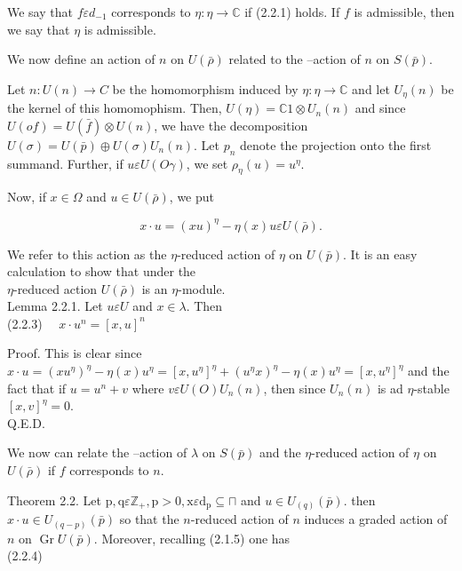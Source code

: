 \documentclass[10pt]{article}
\begin{document}
We say that $f \varepsilon d_{-1}$ corresponds to $\eta: \eta \rightarrow \mathbb{C}$ if (2.2.1) holds. If $f$ is admissible, then we say that $\eta$ is admissible.

We now define an action of $n$ on $U(\bar{\rho})$ related to the --action of $n$ on $S(\bar{p})$.

Let $n: U(n) \rightarrow C$ be the homomorphism induced by $\eta: \eta \rightarrow \mathbb{C}$ and let $U_{\eta}(n)$ be the kernel of this homomophism. Then, $U(\eta)=\mathbb{C} 1 \otimes U_{n}(n)$ and since $U(o f)=U(\bar{f}) \otimes U(n)$, we have the decomposition $U(\sigma)=U(\bar{p}) \oplus U(\sigma) U_{n}(n)$. Let $p_{n}$ denote the projection onto the first summand. Further, if $u \varepsilon U(O \gamma)$, we set $\rho_{\eta}(u)=u^{\eta}$.

Now, if $x \in \Omega$ and $u \in U(\bar{\rho})$, we put


\begin{equation*}
x \cdot u=(x u)^{\eta}-\eta(x) u \varepsilon U(\bar{\rho}) . \tag{2.2.2}
\end{equation*}


We refer to this action as the $\eta$-reduced action of $\eta$ on $U(\bar{p})$. It is an easy calculation to show that under the\\
$\eta$-reduced action $U(\bar{\rho})$ is an $\eta$-module.\\
Lemma 2.2.1. Let $u \varepsilon U$ and $x \in \lambda$. Then\\
(2.2.3) $\quad x \cdot u^{n}=[x, u]^{n}$

Proof. This is clear since $x \cdot u=\left(x u^{\eta}\right)^{\eta}-\eta(x) u^{\eta}= \left[x, u^{\eta}\right]^{\eta}+\left(u^{\eta} x\right)^{\eta}-\eta(x) u^{\eta}=\left[x, u^{\eta}\right]^{\eta}$ and the fact that if $u=u^{n}+v$ where $v \varepsilon U(O) U_{n}(n)$, then since $U_{n}(n)$ is ad $\eta$-stable $[x, v]^{\eta}=0$.\\
Q.E.D.

We now can relate the --action of $\lambda$ on $S(\bar{p})$ and the $\eta$-reduced action of $\eta$ on $U(\bar{\rho})$ if $f$ corresponds to $n$.

Theorem 2.2. Let $\mathrm{p}, \mathrm{q} \varepsilon \mathbb{Z}_{+}, \mathrm{p}>0, \mathrm{x} \varepsilon \mathrm{d}_{\mathrm{p}} \subseteq \sqcap$ and $u \in U_{(q)}(\bar{p})$. then $x \cdot u \in U_{(q-p)}(\bar{p})$ so that the $n$-reduced action of $n$ induces a graded action of $n$ on $\operatorname{Gr} U(\bar{p})$. Moreover, recalling (2.1.5) one has\\
(2.2.4)
\end{document}
